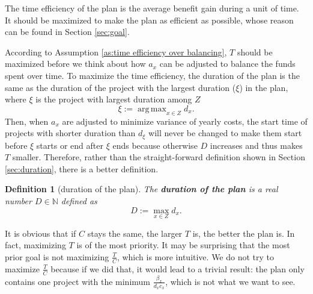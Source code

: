 \documentclass{article}
\DeclareMathOperator*{\argmax}{arg\,max}
\newtheorem{definition}{Definition}
\begin{document}
The time efficiency of the plan is the average benefit gain during a unit of time.
It should be maximized to make the plan as efficient as possible,
whose reason can be found in Section \ref{sec:goal}.

According to Assumption \ref{as:time efficiency over balancing}, $T$ should be maximized before we think about how $a_x$ can be adjusted to balance the funds spent over time.
To maximize the time efficiency, the duration of the plan is the same as the duration of the project with the largest duration ($\xi$) in the plan,
where $\xi$ is the project with largest duration among $Z$
\begin{equation}
\xi:=\argmax_{x\in Z}d_x.
\end{equation}
Then, when $a_x$ are adjusted to minimize variance of yearly costs,
the start time of projects with shorter duration than $d_\xi$ will never be changed to make them start before $\xi$ starts or end after $\xi$ ends
because otherwise $D$ increases and thus makes $T$ smaller.
Therefore, rather than the straight-forward definition shown in Section \ref{sec:duration}, there is a better definition.

\begin{definition}[duration of the plan]
The \textbf{duration of the plan} is a real number $D\in\mathbb N$ defined as
\begin{equation}
\label{eq:duration of the plan}
D:=\max_{x\in Z}d_x.
\end{equation}
\end{definition}

It is obvious that if $C$ stays the same, the larger $T$ is, the better the plan is.
In fact, maximizing $T$ is of the most priority.
It may be surprising that the most prior goal is not maximizing $\frac TC$, which is more intuitive.
We do not try to maximize $\frac TC$ because if we did that,
it would lead to a trivial result:
the plan only contains one project with the minimum $\frac{\beta_x}{d_xc_x}$, which is not what we want to see.
\end{document}
